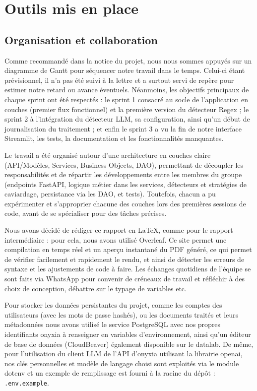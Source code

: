\documentclass[12pt,a4paper]{article}
\begin{document}

\section{Outils mis en place}

\subsection{Organisation et collaboration}

Comme recommandé dans la notice du projet, nous nous sommes appuyés sur un diagramme de Gantt pour séquencer notre travail dans le temps. Celui-ci étant prévisionnel, il n'a pas été suivi à la lettre et a surtout servi de repère pour estimer notre retard ou avance éventuels. Néanmoins, les objectifs principaux de chaque sprint ont été respectés : le sprint 1 consacré au socle de l'application en couches (premier flux fonctionnel) et la première version du détecteur Regex ; le sprint 2 à l'intégration du détecteur LLM, sa configuration, ainsi qu'un début de journalisation du traitement ; et enfin le sprint 3 a vu la fin de notre interface Streamlit, les tests, la documentation et les fonctionnalités manquantes.

Le travail a été organisé autour d'une architecture en couches claire (API/Modèles, Services, Business Objects, DAO), permettant de découpler les responsabilités et de répartir les développements entre les membres du groupe (endpoints FastAPI, logique métier dans les services, détecteurs et stratégies de caviardage, persistance via les DAO, et tests). Toutefois, chacun a pu expérimenter et s'approprier chacune des couches lors des premières sessions de code, avant de se spécialiser pour des tâches précises.

Nous avons décidé de rédiger ce rapport en LaTeX, comme pour le rapport intermédiaire : pour cela, nous avons utilisé Overleaf. Ce site permet une compilation en temps réel et un aperçu instantané du PDF généré, ce qui permet de vérifier facilement et rapidement le rendu, et ainsi de détecter les erreurs de syntaxe et les ajustements de code à faire.
Les échanges quotidiens de l'équipe se sont faits via WhatsApp pour convenir de créneaux de travail et réfléchir à des choix de conception, débattre sur le typage de variables etc.

Pour stocker les données persistantes du projet, comme les comptes des utilisateurs (avec les mots de passe hashés), ou les documents traités et leurs métadonnées nous avons utilisé le service PostgreSQL avec nos propres identifiants onyxia à renseigner en variables d'environnement, ainsi qu'un éditeur de base de données (CloudBeaver) également disponible sur le datalab.
De même, pour l'utilisation du client LLM de l'API d'onyxia utilisant la librairie openai, nos clés personnelles et modèle de langage choisi sont exploités via le module dotenv et un exemple de remplissage est fourni à la racine du dépôt : \texttt{.env.example}.
\end{document}
